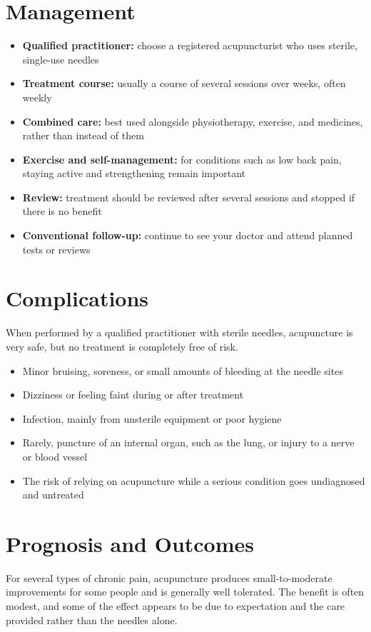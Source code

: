 \section*{Management}
\begin{itemize}
    \item \textbf{Qualified practitioner:} choose a registered acupuncturist who uses sterile, single-use needles
    \item \textbf{Treatment course:} usually a course of several sessions over weeks, often weekly
    \item \textbf{Combined care:} best used alongside physiotherapy, exercise, and medicines, rather than instead of them
    \item \textbf{Exercise and self-management:} for conditions such as low back pain, staying active and strengthening remain important
    \item \textbf{Review:} treatment should be reviewed after several sessions and stopped if there is no benefit
    \item \textbf{Conventional follow-up:} continue to see your doctor and attend planned tests or reviews
\end{itemize}

\section*{Complications}
When performed by a qualified practitioner with sterile needles, acupuncture is very safe, but no treatment is completely free of risk.

\begin{itemize}
    \item Minor bruising, soreness, or small amounts of bleeding at the needle sites
    \item Dizziness or feeling faint during or after treatment
    \item Infection, mainly from unsterile equipment or poor hygiene
    \item Rarely, puncture of an internal organ, such as the lung, or injury to a nerve or blood vessel
    \item The risk of relying on acupuncture while a serious condition goes undiagnosed and untreated
\end{itemize}

\section*{Prognosis and Outcomes}
For several types of chronic pain, acupuncture produces small-to-moderate improvements for some people and is generally well tolerated. The benefit is often modest, and some of the effect appears to be due to expectation and the care provided rather than the needles alone.

